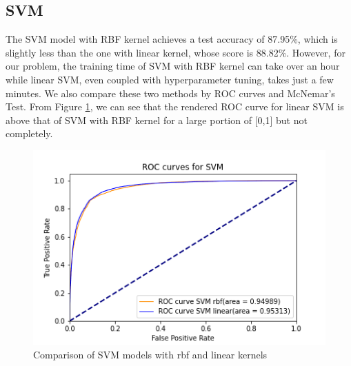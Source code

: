 \documentclass[10pt,twocolumn]{article}
\begin{document}
	\subsection{SVM}
	The SVM model with RBF kernel achieves a test accuracy of 87.95\%, which is slightly less than the one with linear kernel, whose score is 88.82\%. However, for our problem, the training time of SVM with RBF kernel can take over an hour while linear SVM, even coupled with hyperparameter tuning, takes just a few minutes. We also compare these two methods by ROC curves and McNemar's Test. From Figure \ref{ROC_SVM}, we can see that the rendered ROC curve for linear SVM is above that of SVM with RBF kernel for a large portion of [0,1] but not completely.  
	\begin{figure}[H]
		\includegraphics[width=\columnwidth]{ROC_SVM}
		\caption{Comparison of SVM models with rbf and linear kernels}\label{ROC_SVM}
	\end{figure} 
	
\end{document}
